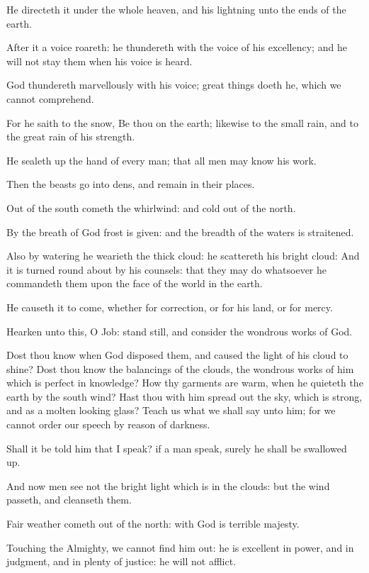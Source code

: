 \Verse He directeth it under the whole heaven, and his lightning unto the ends of the earth.

\Verse After it a voice roareth: he thundereth with the voice of his excellency; and he will not stay them when his voice is heard.

\Verse God thundereth marvellously with his voice; great things doeth he, which we cannot comprehend.

\Verse For he saith to the snow, Be thou on the earth; likewise to the small rain, and to the great rain of his strength.

\Verse He sealeth up the hand of every man; that all men may know his work.

\Verse Then the beasts go into dens, and remain in their places.

\Verse Out of the south cometh the whirlwind: and cold out of the north.

\Verse By the breath of God frost is given: and the breadth of the waters is straitened.

\Verse Also by watering he wearieth the thick cloud: he scattereth his bright cloud: \Verse And it is turned round about by his counsels: that they may do whatsoever he commandeth them upon the face of the world in the earth.

\Verse He causeth it to come, whether for correction, or for his land, or for mercy.

\Verse Hearken unto this, O Job: stand still, and consider the wondrous works of God.

\Verse Dost thou know when God disposed them, and caused the light of his cloud to shine?  \Verse Dost thou know the balancings of the clouds, the wondrous works of him which is perfect in knowledge?  \Verse How thy garments are warm, when he quieteth the earth by the south wind?  \Verse Hast thou with him spread out the sky, which is strong, and as a molten looking glass?  \Verse Teach us what we shall say unto him; for we cannot order our speech by reason of darkness.

\Verse Shall it be told him that I speak? if a man speak, surely he shall be swallowed up.

\Verse And now men see not the bright light which is in the clouds: but the wind passeth, and cleanseth them.

\Verse Fair weather cometh out of the north: with God is terrible majesty.

\Verse Touching the Almighty, we cannot find him out: he is excellent in power, and in judgment, and in plenty of justice: he will not afflict.

